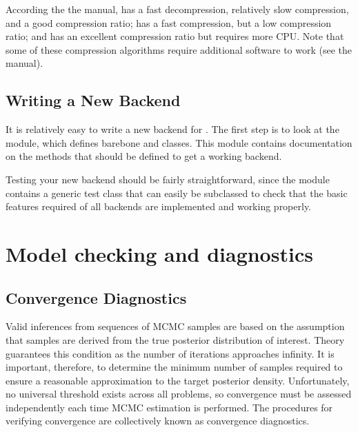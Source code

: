 \documentclass[]{jss}
\begin{document}
According the the  manual,  \cite{zlib} has a fast decompression,
relatively slow compression, and a good compression ratio;
 \cite{lzo}  has a fast compression, but a low compression ratio;
and  \cite{bzip2}  has an excellent compression ratio but requires more CPU. Note that
some of these compression algorithms require additional software to work (see
the  manual).



\subsection{Writing a New Backend}
  \label{writing-a-new-backend}%


It is relatively easy to write a new backend for . The first step is to
look at the \\ module, which defines barebone 
and  classes. This module contains documentation on the methods that
should be defined to get a working backend.

Testing your new backend should be fairly straightforward, since the
 module contains a generic test class that can easily
be subclassed to check that the basic features required of all backends
are implemented and working properly.




\section[Model Checking]{Model checking and diagnostics}
\label{chap:modelchecking}

\subsection{Convergence Diagnostics} %

Valid inferences from sequences of MCMC samples are based on the assumption that samples are derived from the true posterior distribution of interest. Theory guarantees this condition as the number of iterations approaches infinity. It is important, therefore, to determine the minimum number of samples required to ensure a reasonable approximation to the target posterior density. Unfortunately, no universal threshold exists across all problems, so convergence must be assessed independently each time MCMC estimation is performed. The procedures for verifying convergence are collectively known as convergence diagnostics.
\end{document}
